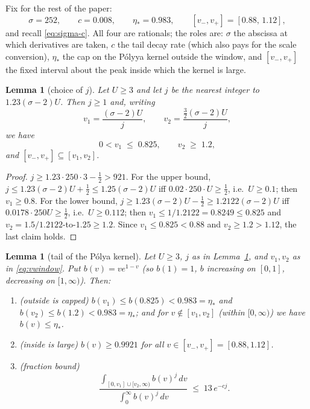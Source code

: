 \documentclass[11pt]{amsart}
\newtheorem{lemma}[theorem]{Lemma}
\numberwithin{equation}{section}
\newcommand{\Sig}{\sigma}
\begin{document}
Fix for the rest of the paper:
\[
\Sig = 252, \qquad c = 0.008, \qquad \eta_* = 0.983, \qquad
[v_-, v_+] = [0.88,\, 1.12],
\]
and recall \eqref{eq:sigma-c}. All four are rationals; the roles are:
$\Sig$ the abscissa at which derivatives are taken, $c$ the tail decay
rate (which also pays for the scale conversion), $\eta_*$ the cap on the
P\'olyya kernel outside the window, and $[v_-,v_+]$ the fixed interval
about the peak inside which the kernel is large.

\begin{lemma}[choice of $j$]\label{lem:j-range}
Let $U \ge 3$ and let $j$ be the nearest integer to $1.23(\Sig-2)U$.
Then $j \ge 1$ and, writing
\[
v_1 = \frac{(\Sig-2)U}{j}, \qquad v_2 = \frac{\tfrac32(\Sig-2)U}{j},
\]
we have
\begin{equation}\label{eq:vwindow}
0 < v_1 \;\le\; 0.825, \qquad v_2 \;\ge\; 1.2,
\end{equation}
and $[v_-,v_+] \subseteq [v_1, v_2]$.
\end{lemma}

\begin{proof}
$j \ge 1.23 \cdot 250 \cdot 3 - \tfrac12 > 921$. For the upper bound,
$j \le 1.23(\Sig-2)U + \tfrac12 \le 1.25(\Sig-2)U$ iff $0.02 \cdot 250
\cdot U \ge \tfrac12$, i.e.\ $U \ge 0.1$; then $v_1 \ge 0.8$. For the
lower bound, $j \ge 1.23(\Sig-2)U - \tfrac12 \ge 1.2122(\Sig-2)U$ iff
$0.0178 \cdot 250 U \ge \tfrac12$, i.e.\ $U \ge 0.112$; then $v_1 \le
1/1.2122 = 0.8249 \le 0.825$ and $v_2 = 1.5/1.2122$-to-$1.25 \ge 1.2$.
Since $v_1 \le 0.825 < 0.88$ and $v_2 \ge 1.2 > 1.12$, the last claim
holds.
\end{proof}

\begin{lemma}[tail of the P\'olya kernel]\label{lem:tail}
Let $U \ge 3$, $j$ as in Lemma~\ref{lem:j-range}, and $v_1, v_2$ as in
\eqref{eq:vwindow}. Put $b(v) = v e^{1-v}$ (so $b(1)=1$, $b$ increasing
on $[0,1]$, decreasing on $[1,\infty)$). Then:
\begin{enumerate}
\item (\emph{outside is capped}) $b(v_1) \le b(0.825) < 0.983 = \eta_*$
and $b(v_2) \le b(1.2) < 0.983 = \eta_*$; and for $v \notin [v_1,v_2]$
(within $[0,\infty)$) we have $b(v) \le \eta_*$.
\item (\emph{inside is large}) $b(v) \ge 0.9921$ for all
$v \in [v_-,v_+] = [0.88,1.12]$.
\item (\emph{fraction bound})
\[
\frac{\displaystyle\int_{[0,v_1]\cup[v_2,\infty)} b(v)^j\,dv}
     {\displaystyle\int_0^\infty b(v)^j\,dv}
\;\le\; 13\, e^{-cj}.
\]
\end{enumerate}
\end{lemma}
\end{document}
